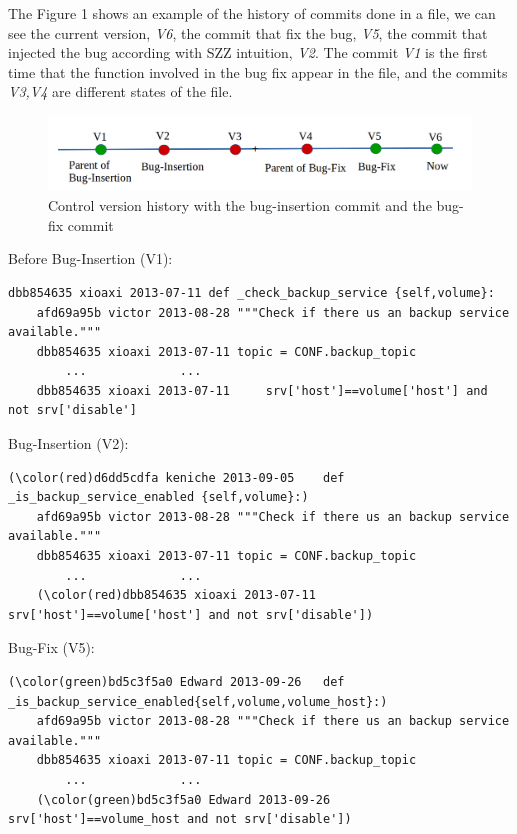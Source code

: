 \documentclass[ifip]{svmult}
\begin{document}
The Figure 1 shows an example of the history of commits done in a file, we can see the current version, \textit{V6}, the commit that fix the bug, \textit{V5}, the commit that injected the bug according with SZZ intuition, \textit{V2}. The commit \textit{V1} is the first time that the function involved in the bug fix appear in the file, and the commits \textit{V3,V4} are different states of the file. 

\begin{figure}[ht]
\centering
\includegraphics[height=2cm]{History.png}
\caption{Control version history with the bug-insertion commit and the bug-fix commit }
\label{fig:history}       %
\end{figure}

Before Bug-Insertion (V1):
\begin{Verbatim}[fontsize=\small,commandchars=\\\(\)]
	dbb854635 xioaxi 2013-07-11	def _check_backup_service {self,volume}:
	afd69a95b victor 2013-08-28	"""Check if there us an backup service available."""
	dbb854635 xioaxi 2013-07-11	topic = CONF.backup_topic
		...				...
	dbb854635 xioaxi 2013-07-11		srv['host']==volume['host'] and not srv['disable']
 \end{Verbatim}

 Bug-Insertion (V2): 
\begin{Verbatim}[fontsize=\small,commandchars=\\\(\)]
	(\color(red)d6dd5cdfa keniche 2013-09-05	def _is_backup_service_enabled {self,volume}:)
	afd69a95b victor 2013-08-28	"""Check if there us an backup service available."""
	dbb854635 xioaxi 2013-07-11	topic = CONF.backup_topic
		...				...
	(\color(red)dbb854635 xioaxi 2013-07-11		srv['host']==volume['host'] and not srv['disable'])
 \end{Verbatim}

Bug-Fix (V5): 
\begin{Verbatim}[fontsize=\small,commandchars=\\\(\)]
	(\color(green)bd5c3f5a0 Edward 2013-09-26	def _is_backup_service_enabled{self,volume,volume_host}:)
	afd69a95b victor 2013-08-28	"""Check if there us an backup service available."""
	dbb854635 xioaxi 2013-07-11	topic = CONF.backup_topic
		...				...
	(\color(green)bd5c3f5a0 Edward 2013-09-26		srv['host']==volume_host and not srv['disable'])
 \end{Verbatim}
\end{document}
